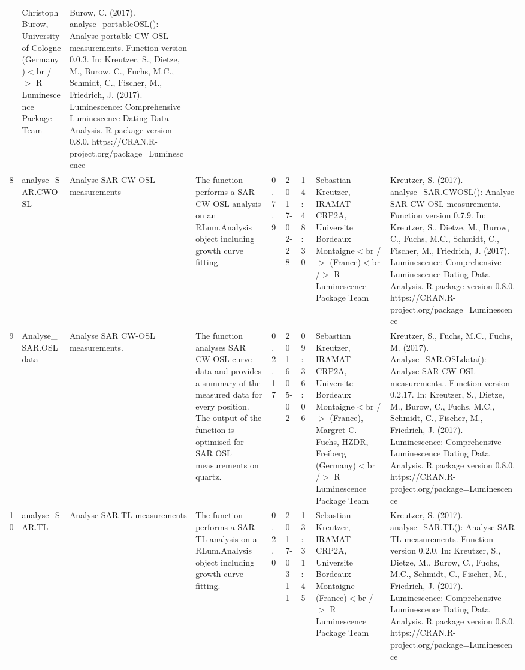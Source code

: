 \begin{table}[ht]
\begin{tabular}{rllllllll}
 & Christoph Burow, University of Cologne (Germany)$<$br /$>$  R Luminescence Package Team & Burow, C. (2017). analyse\_portableOSL(): Analyse portable CW-OSL measurements. Function version 0.0.3. In: Kreutzer, S., Dietze, M., Burow, C., Fuchs, M.C., Schmidt, C., Fischer, M., Friedrich, J. (2017). Luminescence: Comprehensive Luminescence Dating Data Analysis. R package version 0.8.0. https://CRAN.R-project.org/package=Luminescence
 \\ 
  8 & analyse\_SAR.CWOSL & Analyse SAR CW-OSL measurements & The function performs a SAR CW-OSL analysis on an RLum.Analysis  object including growth curve fitting. & 0.7.9 & 2017-02-28 & 14:48:30
 & Sebastian Kreutzer, IRAMAT-CRP2A, Universite Bordeaux Montaigne$<$br /$>$ (France)$<$br /$>$  R Luminescence Package Team & Kreutzer, S. (2017). analyse\_SAR.CWOSL(): Analyse SAR CW-OSL measurements. Function version 0.7.9. In: Kreutzer, S., Dietze, M., Burow, C., Fuchs, M.C., Schmidt, C., Fischer, M., Friedrich, J. (2017). Luminescence: Comprehensive Luminescence Dating Data Analysis. R package version 0.8.0. https://CRAN.R-project.org/package=Luminescence
 \\ 
  9 & Analyse\_SAR.OSLdata & Analyse SAR CW-OSL measurements. & The function analyses SAR CW-OSL curve data and provides a summary of the measured data for every position. The output of the function is optimised for SAR OSL measurements on quartz. & 0.2.17 & 2016-05-02 & 09:36:06
 & Sebastian Kreutzer, IRAMAT-CRP2A, Universite Bordeaux Montaigne$<$br /$>$ (France), Margret C. Fuchs, HZDR, Freiberg (Germany)$<$br /$>$  R Luminescence Package Team & Kreutzer, S., Fuchs, M.C., Fuchs, M. (2017). Analyse\_SAR.OSLdata(): Analyse SAR CW-OSL measurements.. Function version 0.2.17. In: Kreutzer, S., Dietze, M., Burow, C., Fuchs, M.C., Schmidt, C., Fischer, M., Friedrich, J. (2017). Luminescence: Comprehensive Luminescence Dating Data Analysis. R package version 0.8.0. https://CRAN.R-project.org/package=Luminescence
 \\ 
  10 & analyse\_SAR.TL & Analyse SAR TL measurements & The function performs a SAR TL analysis on a RLum.Analysis  object including growth curve fitting. & 0.2.0 & 2017-03-11 & 13:31:45
 & Sebastian Kreutzer, IRAMAT-CRP2A, Universite Bordeaux Montaigne (France)$<$br /$>$  R Luminescence Package Team & Kreutzer, S. (2017). analyse\_SAR.TL(): Analyse SAR TL measurements. Function version 0.2.0. In: Kreutzer, S., Dietze, M., Burow, C., Fuchs, M.C., Schmidt, C., Fischer, M., Friedrich, J. (2017). Luminescence: Comprehensive Luminescence Dating Data Analysis. R package version 0.8.0. https://CRAN.R-project.org/package=Luminescence

\end{tabular}
\end{table}

